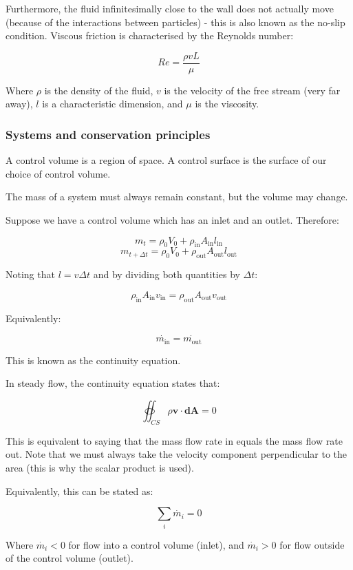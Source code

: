 \documentclass{article}
\begin{document}
Furthermore, the fluid infinitesimally close to the wall does not actually move (because of the interactions between particles) - this is also known as the no-slip condition. Viscous friction is characterised by the Reynolds number:

\[ Re = \frac{\rho v L}{\mu} \]

Where $\rho$ is the density of the fluid, $v$ is the velocity of the free stream (very far away), $l$ is a characteristic dimension, and $\mu$ is the viscosity.

\subsubsection{Systems and conservation principles}

\begin{definition}
    A control volume is a region of space. A control surface is the surface of our choice of control volume.
\end{definition}

\begin{proposition}
    The mass of a system must always remain constant, but the volume may change.
\end{proposition}

Suppose we have a control volume which has an inlet and an outlet. Therefore:

\[ m_t = \rho_0 V_0 + \rho_{\text{in}}A_{\text{in}}l_{\text{in}} \]
\[ m_{t + \Delta t} = \rho_0V_0 + \rho_{\text{out}}A_{\text{out}}l_{\text{out}} \]

Noting that $l = v\Delta t$ and by dividing both quantities by $\Delta t$:

\[ \rho_{\text{in}}A_{\text{in}}v_{\text{in}} = \rho_{\text{out}}A_{\text{out}}v_{\text{out}} \]

Equivalently:

\[ \dot{m_{\text{in}}} = \dot{m_{\text{out}}} \]

This is known as the continuity equation.

\begin{proposition}[Continuity]
    In steady flow, the continuity equation states that:

    \[ \oiint_{CS} \rho \textbf{v} \cdot \textbf{dA} = 0 \]

    This is equivalent to saying that the mass flow rate in equals the mass flow rate out. Note that we must always take the velocity component perpendicular to the area (this is why the scalar product is used).

    Equivalently, this can be stated as:

    \[ \sum_i \dot{m_i} = 0 \]

    Where $\dot{m_i} < 0$ for flow into a control volume (inlet), and $\dot{m_i} > 0$
    for flow outside of the control volume (outlet).
\end{proposition}
\end{document}
